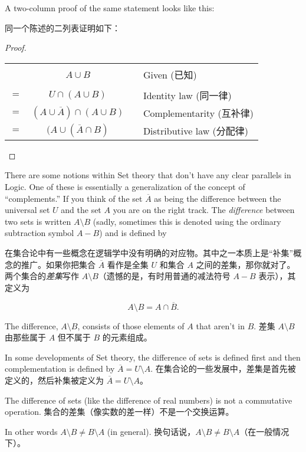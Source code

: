 A two-column proof of the same statement looks like this:

同一个陈述的二列表证明如下：

\begin{proof}

\begin{tabular}{cccl}
  & $A \cup B$ & \rule{36pt}{0pt} & Given (已知) \\
$=$ & $U \cap (A \cup B)$ & & Identity law (同一律) \\
$=$ & $(A \cup \overline{A}) \cap (A \cup B)$ & & Complementarity (互补律) \\
$=$ & $(A \cup (\overline{A} \cap B)$ & & Distributive law (分配律)\\
\end{tabular}

\end{proof}

There are some notions within Set theory that don't have any clear
parallels in Logic.  One of these is essentially a generalization 
of the concept of ``complements.''   If you think of the set $\overline{A}$
as being the difference between the universal set $U$ and the set $A$
you are on the right track.  The 
\emph{difference} between two sets is written 
$A \setminus B$ (sadly, sometimes this is denoted using the ordinary 
subtraction symbol $A-B$) and is defined by

在集合论中有一些概念在逻辑学中没有明确的对应物。其中之一本质上是“补集”概念的推广。如果你把集合 $\overline{A}$ 看作是全集 $U$ 和集合 $A$ 之间的差集，那你就对了。两个集合的\emph{差集}写作 $A \setminus B$（遗憾的是，有时用普通的减法符号 $A-B$ 表示），其定义为

\[   A \setminus B = A \cap \overline{B}. \]

\noindent The difference, $A \setminus B$, consists of those elements of $A$ that aren't in $B$.
\noindent 差集 $A \setminus B$ 由那些属于 $A$ 但不属于 $B$ 的元素组成。

In some developments of Set theory, the difference of sets is 
defined first and then complementation is defined by $\overline{A} = U \setminus A$.
在集合论的一些发展中，差集是首先被定义的，然后补集被定义为 $\overline{A} = U \setminus A$。

The difference of sets (like the difference of real numbers) is not a 
commutative operation.
集合的差集（像实数的差一样）不是一个交换运算。

In other words $A \setminus B \neq B \setminus A$ 
(in general).
换句话说，$A \setminus B \neq B \setminus A$（在一般情况下）。

